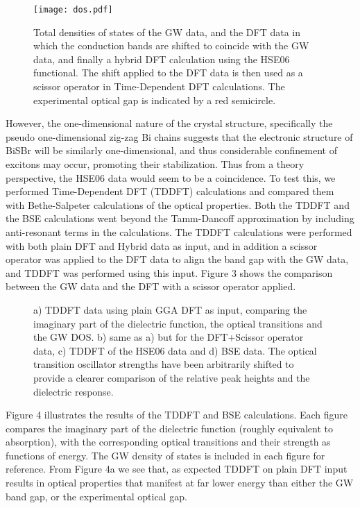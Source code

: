 \documentclass[prb,showpacs,superscriptaddress,titlepage,amsmath,amssymb,twocolumn]{revtex4-1}
\begin{document}
\begin{figure}[!t]
    \centering
    \texttt{[image: dos.pdf]}
    \caption{ Total densities of states of the GW data, and the DFT data in which the conduction bands are shifted to coincide with the GW data, and finally a hybrid DFT calculation using the HSE06 functional. The shift applied to the DFT data is then used as a scissor operator in Time-Dependent DFT calculations. The experimental optical gap is indicated by a red semicircle.}
    \label{fig:bs}
\end{figure}


However, the one-dimensional nature of the crystal structure, specifically the pseudo one-dimensional zig-zag Bi chains suggests that the electronic structure of BiSBr will be similarly one-dimensional, and thus considerable confinement of excitons may occur, promoting their stabilization. Thus from a theory perspective, the HSE06 data would seem to be a coincidence. To test this, we performed Time-Dependent DFT (TDDFT) calculations and compared them with Bethe-Salpeter calculations of the optical properties. Both the TDDFT and the BSE calculations went beyond the Tamm-Dancoff approximation by including anti-resonant terms in the calculations. The TDDFT calculations were performed with both plain DFT and Hybrid data as input, and in addition a scissor operator was applied to the DFT data to align the band gap with the GW data, and TDDFT was performed using this input. Figure 3 shows the comparison between the GW data and the DFT with a scissor operator applied.

\begin{figure}[!t]
    \centering
    \caption{a) TDDFT data using plain GGA DFT as input, comparing the imaginary part of the dielectric function, the optical transitions and the GW DOS. b) same as a) but for the DFT+Scissor operator data, c) TDDFT of the HSE06 data and d) BSE data. The optical transition oscillator strengths have been arbitrarily shifted to provide a clearer comparison of the relative peak heights and the dielectric response.}
    \label{fig:bs}
\end{figure}

 Figure 4 illustrates the results of the TDDFT and BSE calculations. Each figure compares the imaginary part of the dielectric function (roughly equivalent to absorption), with the corresponding optical transitions and their strength as functions of energy. The GW density of states is included in each figure for reference. From Figure 4a we see that, as expected TDDFT on plain DFT input results in optical properties that manifest at far lower energy than either the GW band gap, or the experimental optical gap.
 
\end{document}
